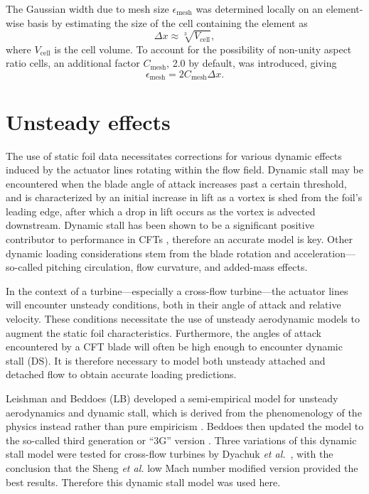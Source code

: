 The Gaussian width due to mesh size $\epsilon_{\mathrm{mesh}}$ was determined
locally on an element-wise basis by estimating the size of the cell containing
the element as
\begin{equation}
    \Delta x \approx \sqrt[3]{V_\mathrm{cell}},
\end{equation}
where $V_\mathrm{cell}$ is the cell volume. To account for the possibility of non-unity aspect ratio cells, an additional factor $C_\mathrm{mesh}$, 2.0 by default, was introduced, giving
\begin{equation}
    \epsilon_{\mathrm{mesh}} = 2C_\mathrm{mesh} \Delta x.
\end{equation}


\section{Unsteady effects}


The use of static foil data necessitates corrections for various dynamic effects
induced by the actuator lines rotating within the flow field. Dynamic stall may
be encountered when the blade angle of attack increases past a certain
threshold, and is characterized by an initial increase in lift as a vortex is
shed from the foil's leading edge, after which a drop in lift occurs as the
vortex is advected downstream. Dynamic stall has been shown to be a significant
positive contributor to performance in CFTs \cite{Para2002, Urbina2013},
therefore an accurate model is key. Other dynamic loading considerations stem
from the blade rotation and acceleration---so-called pitching circulation, flow
curvature, and added-mass effects.

In the context of a turbine---especially a cross-flow turbine---the actuator
lines will encounter unsteady conditions, both in their angle of attack and
relative velocity. These conditions necessitate the use of unsteady aerodynamic
models to augment the static foil characteristics. Furthermore, the angles of
attack encountered by a CFT blade will often be high enough to encounter dynamic
stall (DS). It is therefore necessary to model both unsteady attached and
detached flow to obtain accurate loading predictions.


Leishman and Beddoes (LB) developed a semi-empirical model for unsteady
aerodynamics and dynamic stall, which is derived from the phenomenology of the
physics instead rather than pure empiricism \cite{Leishman1989}. Beddoes then
updated the model to the so-called third generation or ``3G'' version
\cite{Beddoes1993}. Three variations of this dynamic stall model were tested for
cross-flow turbines by Dyachuk \emph{et al.}~\cite{Dyachuk2014}, with the conclusion
that the Sheng \emph{et al.} low Mach number modified version \cite{Sheng2008} provided
the best results. Therefore this dynamic stall model was used here.

